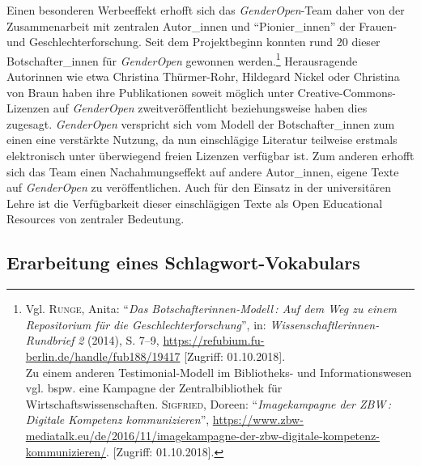 \documentclass[a4paper,
fontsize=11pt,
oneside,
numbers=noperiodatend,
parskip=half-,
bibliography=totoc,
final
]{scrartcl}
\begin{document}
Einen besonderen Werbeeffekt erhofft sich das \emph{GenderOpen}-Team
daher von der Zusammenarbeit mit zentralen Autor\_innen und
\enquote{Pionier\_innen} der Frauen- und Geschlechterforschung. Seit dem
Projektbeginn konnten rund 20 dieser Botschafter\_innen für
\emph{GenderOpen} gewonnen werden.\footnote{Vgl. \textsc{Runge}, Anita:
  \enquote{\emph{Das Botschafterinnen-Modell\,: Auf dem Weg zu einem
  Repositorium für die Geschlechterforschung}}, in:
  \emph{Wissenschaftlerinnen-Rundbrief} \emph{2} (2014), S. 7--9,
  \url{https://refubium.fu-berlin.de/handle/fub188/19417} {[}Zugriff:
  01.10.2018{]}.\\
  Zu einem anderen Testimonial-Modell im Bibliotheks- und
  Informationswesen vgl. bspw. eine Kampagne der Zentralbibliothek für
  Wirtschaftswissenschaften. \textsc{Sigfried}, Doreen:
  \enquote{\emph{Imagekampagne der ZBW\,: Digitale Kompetenz
  kommunizieren}},
  \url{https://www.zbw-mediatalk.eu/de/2016/11/imagekampagne-der-zbw-digitale-kompetenz-kommunizieren/}.
  {[}Zugriff: 01.10.2018{]}.} Herausragende Autorinnen wie etwa
Christina Thürmer-Rohr, Hildegard Nickel oder Christina von Braun haben
ihre Publikationen soweit möglich unter Creative-Commons-Lizenzen auf
\emph{GenderOpen} zweitveröffentlicht beziehungsweise haben dies
zugesagt. \emph{GenderOpen} verspricht sich vom Modell der
Botschafter\_innen zum einen eine verstärkte Nutzung, da nun
einschlägige Literatur teilweise erstmals elektronisch unter überwiegend
freien Lizenzen verfügbar ist. Zum anderen erhofft sich das Team einen
Nachahmungseffekt auf andere Autor\_innen, eigene Texte auf
\emph{GenderOpen} zu veröffentlichen. Auch für den Einsatz in der
universitären Lehre ist die Verfügbarkeit dieser einschlägigen Texte als
Open Educational Resources von zentraler Bedeutung.

\hypertarget{erarbeitung-eines-schlagwort-vokabulars}{%
\subsection{Erarbeitung eines
Schlagwort-Vokabulars}\label{erarbeitung-eines-schlagwort-vokabulars}}
\end{document}
